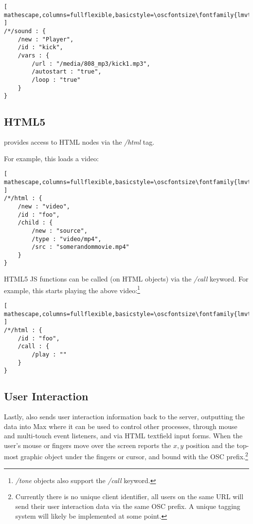 \begin{lstlisting}[ mathescape,columns=fullflexible,basicstyle=\oscfontsize\fontfamily{lmvtt}\selectfont ]
/*/sound : {
    /new : "Player",
    /id : "kick",
    /vars : {
        /url : "/media/808_mp3/kick1.mp3",
        /autostart : "true",
        /loop : "true"
    }
}
\end{lstlisting}


\subsection{HTML5}\label{sec:html}
\drawsocket provides access to HTML nodes via the \textit{/html} tag. 

For example, this loads a video:

\begin{lstlisting}[ mathescape,columns=fullflexible,basicstyle=\oscfontsize\fontfamily{lmvtt}\selectfont ]
/*/html : {
    /new : "video",
    /id : "foo",
    /child : {
        /new : "source",
        /type : "video/mp4",
        /src : "somerandommovie.mp4"
    }
}
\end{lstlisting}

HTML5 JS functions can be called (on HTML objects) via the \textit{/call} keyword. For example, this starts playing the above video:\footnote{\textit{/tone} objects also support the \textit{/call} keyword.}

\begin{lstlisting}[ mathescape,columns=fullflexible,basicstyle=\oscfontsize\fontfamily{lmvtt}\selectfont ]
/*/html : {
    /id : "foo",
    /call : {
        /play : ""
    }
}
\end{lstlisting}


\subsection{User Interaction}\label{sec:interaction}
Lastly, \drawsocket also sends user interaction information back to the server, outputting the data into Max where it can be used to control other processes, through mouse and multi-touch event listeners, and via HTML textfield input forms.
When the user's mouse or fingers move over the screen \drawsocket reports the $x,y$ position and the top-most graphic object under the fingers or cursor, and bound with the OSC prefix.\footnote{Currently there is no unique client identifier, all users on the same URL will send their user interaction data via the same OSC prefix. A unique tagging system will likely be implemented at some point.}

